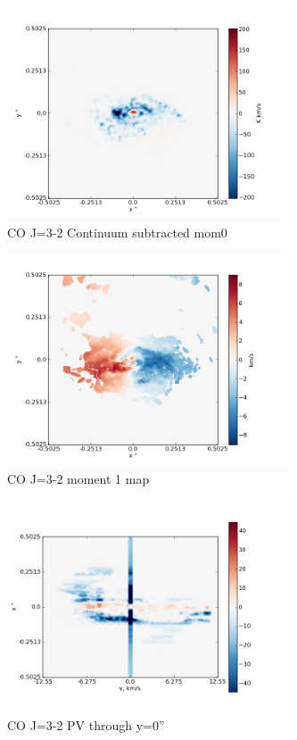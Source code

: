 \documentclass[useAMS,usenatbib]{mn2e}
\begin{document}
\begin{figure}
 \includegraphics[width=84mm]{Figures/sim/imageCO_3-2_30deg_contSub.png}

 \caption{CO J=3-2 Continuum subtracted mom0}
\end{figure}

\begin{figure}
 \includegraphics[width=84mm]{Figures/sim/imageCO_3-2_30deg_mom1.png}

 \caption{CO J=3-2 moment 1 map}
\end{figure}

\begin{figure}
 \includegraphics[width=84mm]{Figures/sim/imageCO_3-2_30deg_PV_centre.png}

 \caption{CO J=3-2 PV through y=0''}
\end{figure}
\end{document}
